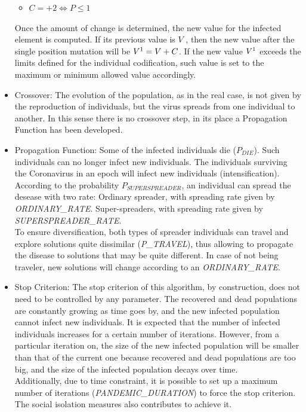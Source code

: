 \documentclass[letterpaper]{article}%
\begin{document}
\begin{itemize}
\begin{itemize}
\item \begin{math}C=+2 \iff P \leq 1\end{math}
\end{itemize}
Once the amount of change is determined, the new value for the infected element is computed. If its previous value is $V$ , then the new value after the single position mutation will be \begin{math}V\textsuperscript{1} = V + C\end{math}. If the new value $V\textsuperscript{1}$ exceeds the limits defined for the individual codification, such value is set to the maximum or minimum allowed value accordingly.
\item Crossover: The evolution of the population, as in the real case, is not given by the reproduction of individuals, but the virus spreads from one individual to another. In this sense there is no crossover step, in its place a Propagation Function has been developed.
\item Propagation Function:
Some of the infected individuals die ($P_{DIE}$). Such individuals can no longer infect new individuals.
The individuals surviving the Coronavirus in an epoch will infect new individuals (intensification). According to the probability $P_{SUPERSPREADER}$, an individual can spread the desease with two rate:
\subitem Ordinary spreader, with spreading rate given by \textit{ORDINARY\_RATE}.
\subitem Super-spreaders, with spreading rate given by \textit{SUPERSPREADER\_RATE}.\\
To ensure diversification, both types of spreader individuals can travel and explore solutions quite dissimilar (\textit{P\_TRAVEL}), thus allowing to propagate the disease to solutions that may be quite different. In case of not being traveler, new solutions will change according to an \textit{ORDINARY\_RATE}.
\item Stop Criterion:
The stop criterion of this algorithm, by construction, does not need to be controlled by any parameter. The recovered and dead populations are constantly growing as time goes by, and the new infected population cannot infect new individuals. It is expected that the number of infected individuals increases for a certain number of iterations. However, from a particular iteration on, the size of the new infected population will be smaller than that of the current one because recovered and dead populations are too big, and the size of the infected population decays over time. \\
Additionally, due to time constraint, it is possible to set up a maximum number of iterations (\textit{PANDEMIC\_DURATION}) to force the stop criterion. The social isolation measures also contributes to achieve it.
\end{itemize}
\end{document}
